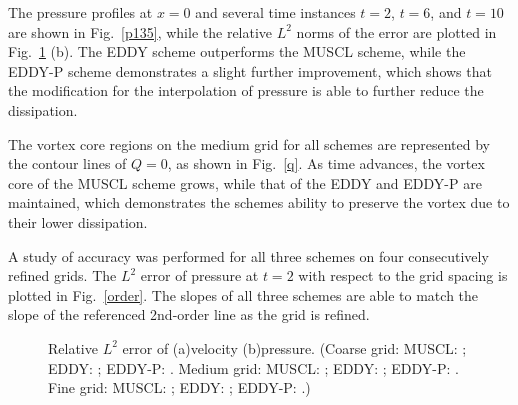 The pressure profiles at $x=0$ and several time instances $t=2$, $t=6$, and $t=10$ are shown in Fig.~\ref{p135}, while the relative $L^{2}$ norms of the error are plotted in Fig.~\ref{l2} (b). The EDDY scheme outperforms the MUSCL scheme, while the EDDY-P scheme demonstrates a slight further improvement, which shows that the modification for the interpolation of pressure is able to further reduce the dissipation. 


The vortex core regions on the medium grid for all schemes are represented by the contour lines of $Q=0$, as shown in Fig.~\ref{q}. As time advances, the vortex core of the MUSCL scheme grows, while that of the EDDY and EDDY-P are maintained, which demonstrates the schemes ability to preserve the vortex due to their lower dissipation.


A study of accuracy was performed for all three schemes on four consecutively refined grids. The $L^{2}$ error of pressure at $t=2$ with respect to the grid spacing is plotted in Fig.~\ref{order}. The slopes of all three schemes are able to match the slope of the referenced 2nd-order line as the grid is refined.
\begin{figure}[t]  
\centering
     \caption{Relative $L^{2}$ error of (a)velocity (b)pressure. (Coarse grid: MUSCL: \mliner; EDDY: \eliner; EDDY-P: \epliner. Medium grid: MUSCL: \mlineg; EDDY: \elineg; EDDY-P: \eplineg. Fine grid: MUSCL: \mlineb; EDDY: \elineb; EDDY-P: \eplineb.)}
     \label{l2}   
\end{figure}
